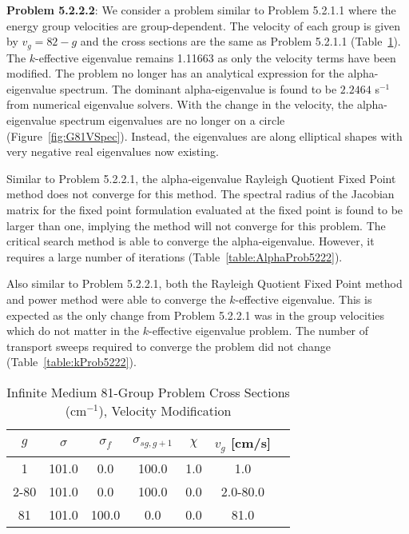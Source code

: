 \textbf{Problem 5.2.2.2}: We consider a problem similar to Problem 5.2.1.1 where the energy group velocities are group-dependent. The velocity of each group is given by $v_{g} = 82 - g$ and the cross sections are the same as Problem 5.2.1.1 (Table~\ref{table:G81v}). The $k$-effective eigenvalue remains 1.11663 as only the velocity terms have been modified. The problem no longer has an analytical expression for the alpha-eigenvalue spectrum. The dominant alpha-eigenvalue is found to be $2.2464$ s$^{-1}$ from numerical eigenvalue solvers. With the change in the velocity, the alpha-eigenvalue spectrum eigenvalues are no longer on a circle (Figure~\ref{fig:G81VSpec}). Instead, the eigenvalues are along elliptical shapes with very negative real eigenvalues now existing. 


Similar to Problem 5.2.2.1, the alpha-eigenvalue Rayleigh Quotient Fixed Point method does not converge for this method. The spectral radius of the Jacobian matrix for the fixed point formulation evaluated at the fixed point is found to be larger than one, implying the method will not converge for this problem. The critical search method is able to converge the alpha-eigenvalue. However, it requires a large number of iterations (Table~\ref{table:AlphaProb5222}).

Also similar to Problem 5.2.2.1, both the Rayleigh Quotient Fixed Point method and power method were able to converge the $k$-effective eigenvalue. This is expected as the only change from Problem 5.2.2.1 was in the group velocities which do not matter in the $k$-effective eigenvalue problem. The number of transport sweeps required to converge the problem did not change (Table~\ref{table:kProb5222}).

\begin{table}[!htbp]
    \centering
    \caption{Infinite Medium 81-Group Problem Cross Sections (cm$^{-1}$), Velocity Modification}
\label{table:G81v}
    \begin{tabular}{*7c}
        \toprule
	$g$ & $\sigma$ & $\sigma_{f}$ & $\sigma_{sg,g+1}$ & $\chi$ & $v_{g}$ [cm/s] \\ 
        \midrule
	1 & 101.0 & 0.0 & 100.0 & 1.0 & 1.0 \\
	2-80 & 101.0 & 0.0 & 100.0 & 0.0 & 2.0-80.0 \\
	81 & 101.0 & 100.0 & 0.0 & 0.0 & 81.0 \\
        \bottomrule
    \end{tabular}
\end{table}


